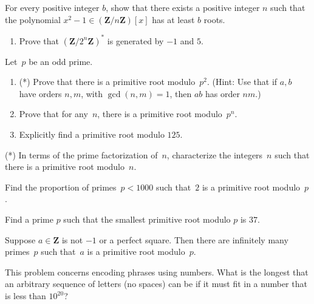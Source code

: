 \documentclass{exam}
\newcommand{\Z}{\mathbb Z}
\newcommand{\con}{\equiv}
\newcommand{\zmod}[1]{\Z/#1\Z{}}
\renewcommand{\mathbb}{\mathbf}
\begin{document}
\begin{questions}
\question[10]
For every positive integer $b$, show that there exists a positive
integer $n$ such that the polynomial $x^2-1\in(\zmod{n})[x]$
has at least $b$ roots.

\question[15]\label{ex:prim1}
\begin{enumerate}
\item Prove that $(\zmod{2^n})^*$ is generated by $-1$ and $5$.
\end{enumerate}

\question[15]\label{ex:prim2}
Let~$p$ be an odd prime.
\begin{enumerate}
\item (*) Prove that there is a primitive root modulo~$p^2$.
(Hint: Use that if $a, b$
      have orders $n, m$, with $\gcd(n,m)=1$, then $ab$ has order $nm$.)
\item Prove that for any~$n$, there is a primitive root modulo~$p^n$.
\item Explicitly find a primitive root modulo $125$.
\end{enumerate}

 \question[10] \label{ex:prim_fac}(*)
 In terms of the prime factorization of~$n$, characterize the
 integers~$n$ such that there is a primitive root modulo~$n$.



\question[10]  \label{ex:comp_prop} Find the proportion of primes~$p<1000$
such that~$2$ is a primitive root modulo~$p$.

\question[10] \label{ex:pr2} Find a prime $p$ such that the smallest
primitive root modulo $p$ is $37$.

\question[50]
Suppose $a\in\Z$ is not $-1$ or a perfect square.  Then there are
infinitely many primes~$p$ such that~$a$ is a primitive root
modulo~$p$.

\question[5]\label{ex:crypto2}  This problem concerns encoding phrases
using numbers.
What is the longest that an arbitrary sequence of letters (no spaces)
can be if it must fit in a number that is less than $10^{20}$?


\end{questions}
\end{document}
